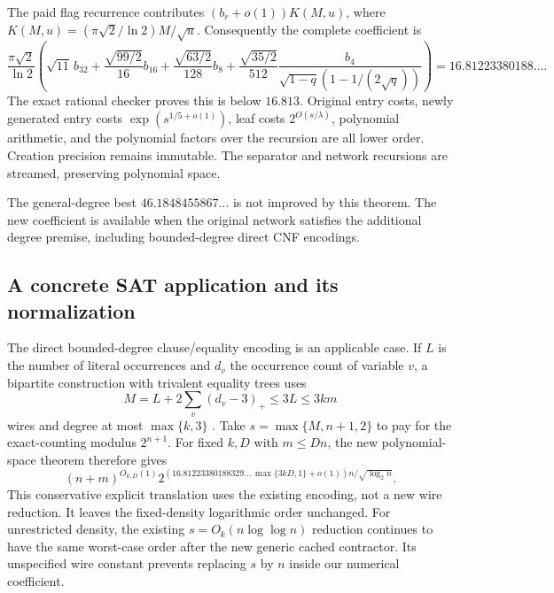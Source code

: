 The paid flag recurrence contributes $(b_r+o(1))K(M,u)$, where
$K(M,u)=(\pi\sqrt2/\ln2)M/\sqrt u$. Consequently the complete coefficient is
\[
 \frac{\pi\sqrt2}{\ln2}\left(
 \sqrt{11}\,b_{32}
 +\frac{\sqrt{99/2}}{16}b_{16}
 +\frac{\sqrt{63/2}}{128}b_8
 +\frac{\sqrt{35/2}}{512}
    \frac{b_4}{\sqrt{1-q}(1-1/(2\sqrt q))}
 \right)
 =16.81223380188\ldots.
\]
The exact rational checker proves this is below $16.813$.
Original entry costs, newly generated entry costs
$\exp(s^{1/5+o(1)})$, leaf costs $2^{O(s/\lambda)}$, polynomial arithmetic,
and the polynomial factors over the recursion are all lower order.
Creation precision remains immutable. The separator and network recursions
are streamed, preserving polynomial space.

The general-degree best $46.1848455867\ldots$ is not improved by this theorem.
The new coefficient is available when the original network satisfies the
additional degree premise, including bounded-degree direct CNF encodings.

\subsection{A concrete SAT application and its normalization}
The direct bounded-degree clause/equality encoding is an applicable case.
If $L$ is the number of literal occurrences and $d_v$ the occurrence count of
variable $v$, a bipartite construction with trivalent equality trees uses
\[
 M=L+2\sum_v(d_v-3)_+\le3L\le3km
\]
wires and degree at most $\max\{k,3\}$ \cite{flags}. Take
$s=\max\{M,n+1,2\}$ to pay for the exact-counting modulus $2^{n+1}$.
For fixed $k,D$ with $m\le Dn$, the new polynomial-space theorem therefore gives
\[
 (n+m)^{O_{k,D}(1)}
 2^{(16.81223380188329\ldots\,\max\{3kD,1\}+o(1))
                  n/\sqrt{\log_2n}}.
\]
This conservative explicit translation uses the existing encoding, not a
new wire reduction. It leaves the fixed-density logarithmic order unchanged.
For unrestricted density, the existing $s=O_k(n\log\log n)$ reduction
continues to have the same worst-case order after the new generic cached
contractor. Its unspecified wire constant prevents replacing $s$ by $n$
inside our numerical coefficient.
